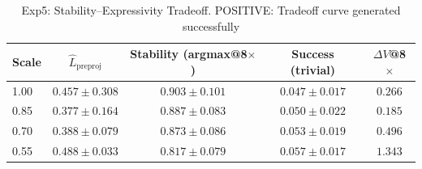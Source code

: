 \begin{table}[t]
\centering
\caption{Exp5: Stability–Expressivity Tradeoff. POSITIVE: Tradeoff curve generated successfully}
\label{tab:exp5-tradeoff}
\begin{tabular}{lcccc}
\toprule
Scale & $\hat{L}_{\text{preproj}}$ & Stability (argmax@8$\times$) & Success (trivial) & $\Delta V$@8$\times$ \\
\midrule
1.00 & $0.457 \pm 0.308$ & $0.903 \pm 0.101$ & $0.047 \pm 0.017$ & $0.266$ \\
0.85 & $0.377 \pm 0.164$ & $0.887 \pm 0.083$ & $0.050 \pm 0.022$ & $0.185$ \\
0.70 & $0.388 \pm 0.079$ & $0.873 \pm 0.086$ & $0.053 \pm 0.019$ & $0.496$ \\
0.55 & $0.488 \pm 0.033$ & $0.817 \pm 0.079$ & $0.057 \pm 0.017$ & $1.343$ \\
\bottomrule
\end{tabular}
\end{table}

